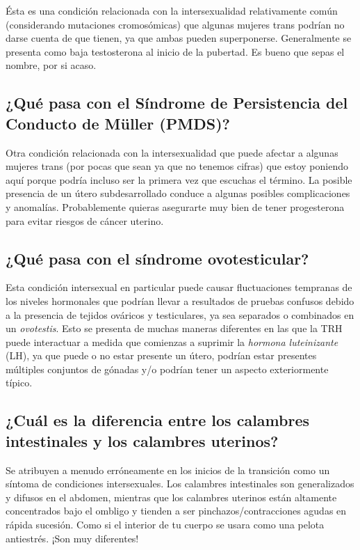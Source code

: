 \documentclass{article}
\begin{document}
Ésta es una condición relacionada con la intersexualidad relativamente común (considerando mutaciones cromosómicas) que algunas mujeres trans podrían no darse cuenta de que tienen, ya que ambas pueden superponerse. Generalmente se presenta como baja testosterona al inicio de la pubertad. Es bueno que sepas el nombre, por si acaso.

\subsection{¿Qué pasa con el Síndrome de Persistencia del Conducto de Müller (PMDS)?}

Otra condición relacionada con la intersexualidad que puede afectar a algunas mujeres trans (por pocas que sean ya que no tenemos cifras) que estoy poniendo aquí porque podría incluso ser la primera vez que escuchas el término. La posible presencia de un útero subdesarrollado conduce a algunas posibles complicaciones y anomalías. Probablemente quieras asegurarte muy bien de tener progesterona para evitar riesgos de cáncer uterino.

\subsection{¿Qué pasa con el síndrome ovotesticular?}

Esta condición intersexual en particular puede causar fluctuaciones tempranas de los niveles hormonales que podrían llevar a resultados de pruebas confusos debido a la presencia de tejidos ováricos y testiculares, ya sea separados o combinados en un \textit{ovotestis}. Esto se presenta de muchas maneras diferentes en las que la TRH puede interactuar a medida que comienzas a suprimir la \textit{hormona luteinizante} (LH), ya que puede o no estar presente un útero, podrían estar presentes múltiples conjuntos de gónadas y/o podrían tener un aspecto exteriormente típico.

\subsection{¿Cuál es la diferencia entre los calambres intestinales y los calambres uterinos?}\label{11-35}

Se atribuyen a menudo erróneamente en los inicios de la transición como un síntoma de condiciones intersexuales. Los calambres intestinales son generalizados y difusos en el abdomen, mientras que los calambres uterinos están altamente concentrados bajo el ombligo y tienden a ser pinchazos/contracciones agudas en rápida sucesión. Como si el interior de tu cuerpo se usara como una pelota antiestrés. ¡Son muy diferentes!
\end{document}
